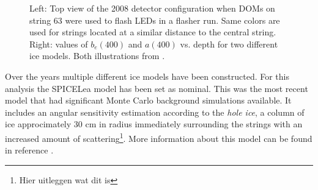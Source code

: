 \begin{figure}[ht]
\begin{minipage}{6in}
  \centering
  \hspace*{.7in}
\end{minipage}
\caption{Left: Top view of the 2008 detector configuration when DOMs on string 63 were used to flash LEDs in a flasher run. Same colors are used for strings located at a similar distance to the central string. Right: values of $b_{e}(400)$ and $a(400)$ vs. depth for two different ice models. Both illustrations from \cite{1412998}.}
%
\label{fig:2008config}
\end{figure}

Over the years multiple different ice models have been constructed. For this analysis the SPICELea model has been set as nominal. This was the most recent model that had significant Monte Carlo background simulations available. It includes an angular sensitivity estimation according to the \textit{hole ice}, a column of ice approcimately 30 cm in radius immediately surrounding the strings with an increased amount of scattering\footnote{Hier uitleggen wat dit is}. More information about this model can be found in reference \cite{1412998}.
